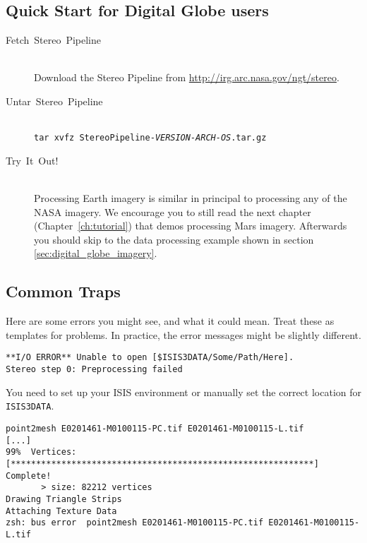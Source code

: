 \subsection{Quick Start for Digital Globe users}
\label{quickstartDG}
\begin{description}

\item[{Fetch~Stereo~Pipeline}] ~\\
Download the Stereo Pipeline from \url{http://irg.arc.nasa.gov/ngt/stereo}.

\item[{Untar~Stereo~Pipeline}] ~\\
\texttt{tar xvfz StereoPipeline-\textit{VERSION-ARCH-OS}.tar.gz}

\item [{Try~It~Out!}] ~\\
Processing Earth imagery is similar in principal to processing any of
the NASA imagery. We encourage you to still read the next chapter
(Chapter~\ref{ch:tutorial}) that demos processing Mars
imagery. Afterwards you should skip to the data processing example
shown in section \ref{sec:digital_globe_imagery}.

\end{description}

\subsection{Common Traps}

Here are some errors you might see, and what it could mean. Treat
these as templates for problems.  In practice, the error messages might
be slightly different.

\begin{verbatim}
**I/O ERROR** Unable to open [$ISIS3DATA/Some/Path/Here].
Stereo step 0: Preprocessing failed
\end{verbatim}

You need to set up your ISIS environment or manually set the correct
location for \texttt{ISIS3DATA}.

\begin{verbatim}
point2mesh E0201461-M0100115-PC.tif E0201461-M0100115-L.tif
[...]
99%  Vertices:   [************************************************************] Complete!
       > size: 82212 vertices
Drawing Triangle Strips
Attaching Texture Data
zsh: bus error  point2mesh E0201461-M0100115-PC.tif E0201461-M0100115-L.tif
\end{verbatim}

